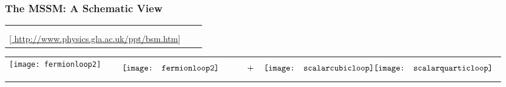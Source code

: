 \documentclass[10pt,aspectratio=169]{beamer}
\begin{document}
\begin{frame}
  \frametitle{The MSSM: A Schematic View}
  \begin{tabularx}{\textwidth}{VVV}
    \begin{tabular}{c}
    \includegraphics[width=0.25\textwidth]{susyparticles_sm_cropped} \\
    \phantom{\tiny Caption}
  \end{tabular} &
    \hspace{15pt}
     &
    \begin{tabular}{c}
      \includegraphics[width=0.5\textwidth]{susyparticles_sm} \\
      {\tiny [\href{http://www.physics.gla.ac.uk/ppt/bsm.htm}{%
      http://www.physics.gla.ac.uk/ppt/bsm.htm}] }
    \end{tabular}
  \end{tabularx}
  \vspace*{-70pt}
  \begin{tabular}{VVV}
    \texttt{[image: fermionloop2]} &
    \hspace{15pt}
     &
    \begin{equation*}
      \parbox{20mm}{\texttt{[image: fermionloop2]}}
      \quad \quad \quad \, + \quad
      \parbox{20mm}{\texttt{[image: scalarcubicloop]} \\
        \vspace*{-5pt}
      \texttt{[image: scalarquarticloop]} }
    \end{equation*}
  \end{tabular}
  \vspace{90pt}
\end{frame}
\end{document}
